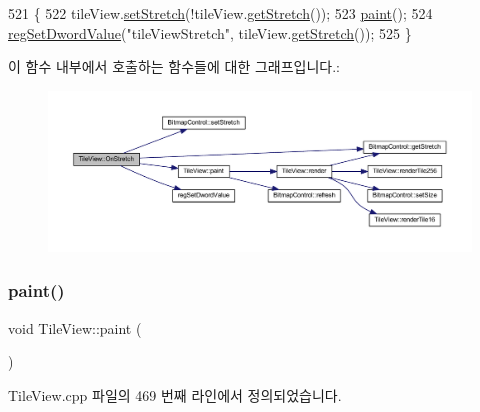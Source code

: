 \begin{DoxyCode}
521 \{
522   tileView.\mbox{\hyperlink{class_bitmap_control_ab545e15ea3edda9f0d80c0b8b0b7c812}{setStretch}}(!tileView.\mbox{\hyperlink{class_bitmap_control_a1d3cff9a3b57dd7558d678177dcf4b5c}{getStretch}}());
523   \mbox{\hyperlink{class_tile_view_a4341071a0cab0d5a8b6dfa7318230636}{paint}}();
524   \mbox{\hyperlink{_reg_8cpp_a758e775489a3fb5c3cc7071fdd5af87e}{regSetDwordValue}}(\textcolor{stringliteral}{"tileViewStretch"}, tileView.\mbox{\hyperlink{class_bitmap_control_a1d3cff9a3b57dd7558d678177dcf4b5c}{getStretch}}());  
525 \}
\end{DoxyCode}
이 함수 내부에서 호출하는 함수들에 대한 그래프입니다.\+:
\nopagebreak
\begin{figure}[H]
\begin{center}
\leavevmode
\includegraphics[width=350pt]{class_tile_view_afe0a1c444008b7e76d4669ffdda2e0bd_cgraph}
\end{center}
\end{figure}
\mbox{\label{class_tile_view_a4341071a0cab0d5a8b6dfa7318230636}} 
\subsubsection{\texorpdfstring{paint()}{paint()}}
{\footnotesize\ttfamily void Tile\+View\+::paint (\begin{DoxyParamCaption}{ }\end{DoxyParamCaption})}



Tile\+View.\+cpp 파일의 469 번째 라인에서 정의되었습니다.


